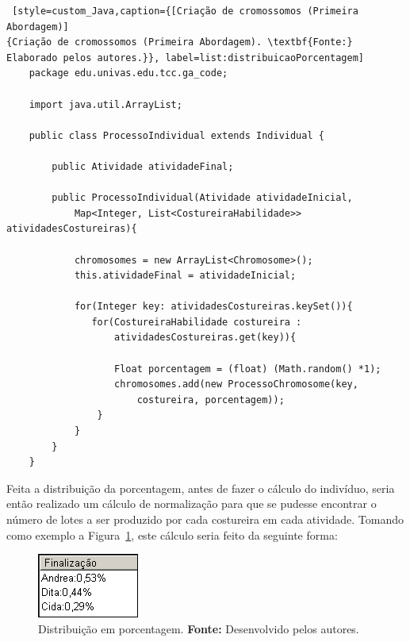\begin{lstlisting} [style=custom_Java,caption={[Criação de cromossomos (Primeira Abordagem)]
{Criação de cromossomos (Primeira Abordagem). \textbf{Fonte:} Elaborado pelos autores.}}, label=list:distribuicaoPorcentagem] 	
	package edu.univas.edu.tcc.ga_code;
	
	import java.util.ArrayList;
	
	public class ProcessoIndividual extends Individual {
		
		public Atividade atividadeFinal;
		
		public ProcessoIndividual(Atividade atividadeInicial,
			Map<Integer, List<CostureiraHabilidade>> atividadesCostureiras){
		
			chromosomes = new ArrayList<Chromosome>();
			this.atividadeFinal = atividadeInicial;
			
			for(Integer key: atividadesCostureiras.keySet()){
			   for(CostureiraHabilidade costureira : 
				   atividadesCostureiras.get(key)){
				
				   Float porcentagem = (float) (Math.random() *1);
				   chromosomes.add(new ProcessoChromosome(key, 
					   costureira, porcentagem));
				}
			}
		}
	}

\end{lstlisting}
 
\par Feita a distribuição da porcentagem, antes de fazer o cálculo do indivíduo, seria então realizado 
um cálculo de normalização para que se pudesse encontrar o número de lotes a ser
produzido por cada costureira em cada atividade. Tomando como exemplo a Figura~\ref{fig:distribuicao_porcentagem}, este cálculo seria feito da seguinte forma:

\begin{figure}[h!]
	\centerline{\includegraphics[scale=1.0]{./imagens/distribuicao_porcentagem.png}}
	\caption[Distribuição em porcentagem.]
	{Distribuição em porcentagem. \textbf{Fonte:} Desenvolvido pelos autores.}
	\label{fig:distribuicao_porcentagem}
\end{figure}

